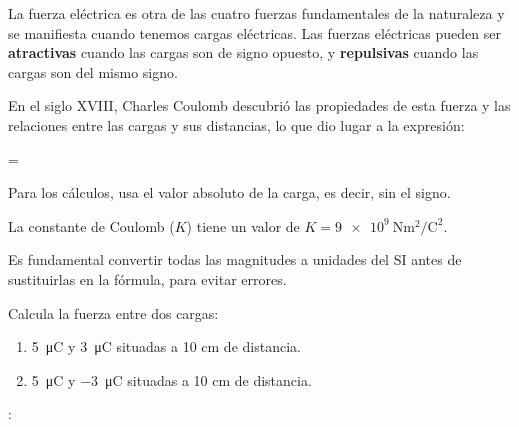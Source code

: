 La fuerza eléctrica es otra de las cuatro fuerzas fundamentales de la naturaleza y se manifiesta cuando tenemos cargas eléctricas.
Las fuerzas eléctricas pueden ser \textbf{atractivas} cuando las cargas son de signo opuesto, y \textbf{repulsivas} cuando las cargas son del mismo signo.

En el siglo XVIII, Charles Coulomb descubrió las propiedades de esta fuerza y las relaciones entre las cargas y sus distancias, lo que dio lugar a la expresión:
\vspace{36pt}

\begin{centeredequation}
     =
     \cdot
\end{centeredequation}

\vspace{36pt}

\begin{remark}
    Para los cálculos, usa el valor absoluto de la carga, es decir, sin el signo.
\end{remark}

La constante de Coulomb (\( K \)) tiene un valor de \( K = \qty{9e9}{\newton\square\metre\per\square\coulomb} \).

\begin{remark}
    Es fundamental convertir todas las magnitudes a unidades del SI antes de sustituirlas en la fórmula, para evitar errores.
\end{remark}


\begin{exercise}
    Calcula la fuerza entre dos cargas:
    \begin{enumerate}[label=\alph*)]
\item \qty{+5}{\micro\coulomb} y \qty{+3}{\micro\coulomb} situadas a 10 cm de distancia.
\item \qty{+5}{\micro\coulomb} y \qty{-3}{\micro\coulomb} situadas a 10 cm de distancia.
    \end{enumerate}

    \datos{}: \ctecoulomb

\end{exercise}


